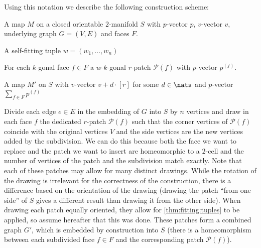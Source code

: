 Using this notation we describe the following construction scheme:

\begin{construction}\label{const:map}
  \begin{cinput}
  \item A map $M$ on a closed orientable $2$-manifold $S$ with $p$-vector $p$, $v$-vector $v$, underlying graph $G = (V, E)$ and faces $F$. 
  \item A self-fitting tuple $w = (w_1, \dots, w_n)$
  \item For each $k$-gonal face $f \in F$ a $w$-$k$-gonal $r$-patch $\mathcal{P}(f)$ with $p$-vector $p^{(f)}$.
  \end{cinput}
  \begin{coutput}
    \item A map $M'$ on $S$ with $v$-vector $v + d \cdot [r]$ for some $d \in \nats$ and $p$-vector $\sum_{f \in F} p^{(f)}$
  \end{coutput} 
  \begin{cdescription} 
    Divide each edge $e \in E$ in the embedding of $G$ into $S$ by $n$ vertices and draw in each face $f$ the dedicated $r$-patch $\mathcal{P}(f)$ such that the corner vertices of $\mathcal{P}(f)$ coincide with the original vertices $V$ and the side vertices are the new vertices added by the subdivision. We can do this because both the face we want to replace and the patch we want to insert are homeomorphic to a $2$-cell and the number of vertices of the patch and the subdivision match exactly. Note that each of these patches may allow for many distinct drawings. While the rotation of the drawing is irrelevant for the correctness of the construction, there is a difference based on the orientation of the drawing (drawing the patch “from one side” of $S$ gives a different result than drawing it from the other side). When drawing each patch equally oriented, they allow for \autoref{thm:fitting:tuples} to be applied, so assume hereafter that this was done. These patches form a combined graph $G'$, which is embedded by construction into $S$ (there is a homeomorphism between each subdivided face $f \in F$ and the corresponding patch $\mathcal{P}(f)$). 


\end{cdescription}
\end{construction}
